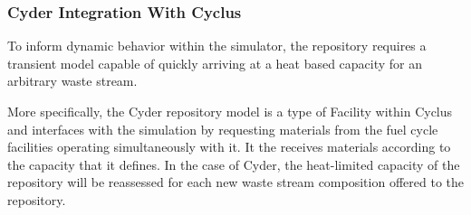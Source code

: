 \subsubsection{Cyder Integration With Cyclus}

To inform dynamic behavior within the simulator, the repository requires 
a transient model capable of quickly arriving at a heat based 
capacity for an arbitrary waste stream. 

More specifically, the Cyder repository model is a type of Facility within 
Cyclus and interfaces with the simulation by requesting materials from the fuel 
cycle facilities operating simultaneously with it. It the receives materials 
according to the capacity that it defines. In the case of Cyder, the 
heat-limited capacity of the repository will be reassessed for each new waste 
stream composition offered to the repository.


